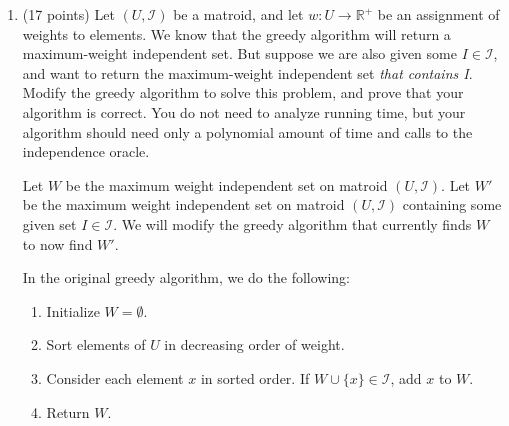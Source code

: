 \documentclass[11pt]{article}
\newcommand{\union}{\cup}
\begin{document}
\begin{enumerate}
For this inequality to hold true, there must be some $i$ for which: 

$|A \cap U_i| < |B \cap U_i|$

Since $B \in \mathcal I$, we know that for this specific value $i$, $B$ has no more than $r_i$ elements in it from $U_i$. 
Therefore $A$ has strictly fewer than $r_i$ elements in it from $U_i$. We consider $x$ to be an arbitrary element in $U_i$ such that $x \in B \ A$. 
Now, we consider set $A \union \{x\}$. Since $A$ has strictly fewer than $r_i$ elements in it from $U_i$, adding $1$ element from $U_i$ ($x$)
means that the resulting set $A \union \{x\}$ has no more than $r_i$ elements in it from $U_i$. 
Thus, $A \union \{x\} \in \mathcal I$, and this property holds.

\medbreak

In proving these $3$ properties, we have proven that $(U, \mathcal I)$ is a matroid.

\bigbreak

\item (17 points) Let $(U, \mathcal I)$ be a matroid, and let $w : U \rightarrow \mathbb{R}^+$ be an assignment of weights to elements. 
We know that the greedy algorithm will return a maximum-weight independent set.  But suppose we are also given some $I \in \mathcal I$, 
and want to return the maximum-weight independent set \emph{that contains I}.  Modify the greedy algorithm to solve this problem, 
and prove that your algorithm is correct. You do not need to analyze running time, but your algorithm should need only a polynomial amount of time 
and calls to the independence oracle.

Let $W$ be the maximum weight independent set on matroid $(U, \mathcal I)$. 
Let $W'$ be the maximum weight independent set on matroid $(U, \mathcal I)$ containing some given set $I \in \mathcal I$.
We will modify the greedy algorithm that currently finds $W$ to now find $W'$. 

In the original greedy algorithm, we do the following:

\begin{enumerate}[label=\arabic*., noitemsep]
    \item Initialize $W = \emptyset$.
    \item Sort elements of $U$ in decreasing order of weight.
    \item Consider each element $x$ in sorted order. If $W \union \{x\} \in \mathcal I$, add $x$ to $W$.
    \item Return $W$.
\end{enumerate}


\end{enumerate}
\end{document}
